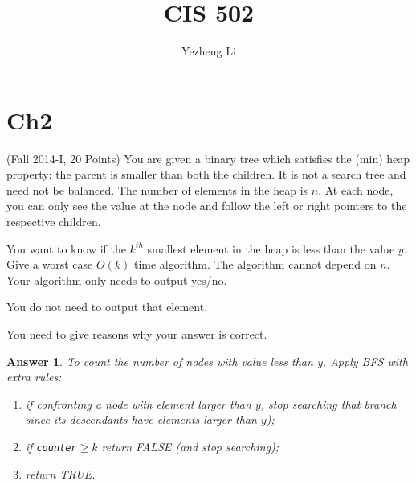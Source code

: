 \documentclass[11pt]{article}
\title{CIS 502}
\author{Yezheng Li}
\theoremstyle{numberplain}
\theoremstyle{nonumberplain}
\newtheorem{ans}{Answer}
\newcommand{\0}{{\mathbf{0}}}
\begin{document}
\maketitle
\tableofcontents
\section{Ch2}

\begin{ques}(Fall 2014-I, 20 Points) You are given a binary tree which satisfies the (min) heap property: the
parent is smaller than both the children. It is not a search tree and need not be balanced. The
number of elements in the heap is $n$. At each node, you can only see the value at the node and
follow the left or right pointers to the respective children.\par 
You want to know if the $k^{th}$ smallest element in the heap is less than the value $y$. Give a
worst case $O(k)$ time algorithm. The algorithm cannot depend on $n$. Your algorithm only needs to output yes/no.\par 
 You do not need to output that element. \par 
You need to give reasons why your answer is correct.
\end{ques}
\begin{ans} To count the number of nodes with value less than y.
Apply BFS with extra rules:
\begin{enumerate}
\item if confronting a node with element larger than $y$, stop searching that branch since its descendants have elements larger than $y$);
\item if {\tt counter}$\geq k$ return FALSE (and stop searching);
\item return TRUE.
\end{enumerate}
\end{ans}
\end{document}
